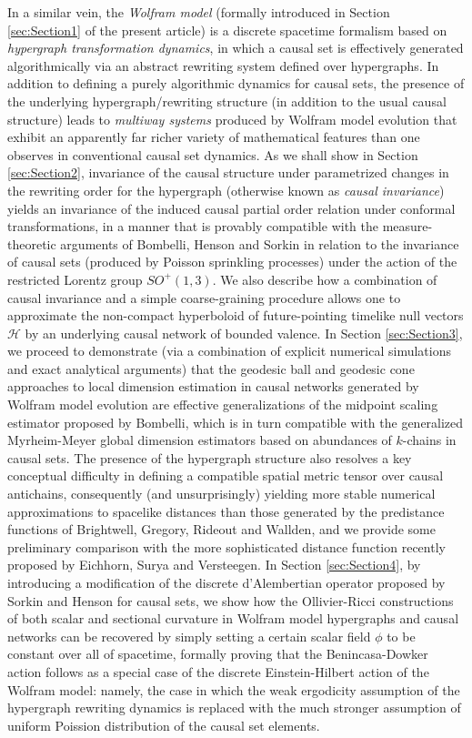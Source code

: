 \documentclass{article}
\begin{document}
In a similar vein, the \textit{Wolfram model}\cite{wolfram}\cite{wolfram2} (formally introduced in Section \ref{sec:Section1} of the present article) is a discrete spacetime formalism based on \textit{hypergraph transformation dynamics}\cite{gorard}\cite{gorard2}, in which a causal set is effectively generated algorithmically via an abstract rewriting system defined over hypergraphs. In addition to defining a purely algorithmic dynamics for causal sets, the presence of the underlying hypergraph/rewriting structure (in addition to the usual causal structure) leads to \textit{multiway systems} produced by Wolfram model evolution that exhibit an apparently far richer variety of mathematical features than one observes in conventional causal set dynamics. As we shall show in Section \ref{sec:Section2}, invariance of the causal structure under parametrized changes in the rewriting order for the hypergraph (otherwise known as \textit{causal invariance}) yields an invariance of the induced causal partial order relation under conformal transformations, in a manner that is provably compatible with the measure-theoretic arguments of Bombelli, Henson and Sorkin\cite{bombelli4} in relation to the invariance of causal sets (produced by Poisson sprinkling processes) under the action of the restricted Lorentz group ${SO^{+} \left( 1, 3 \right)}$. We also describe how a combination of causal invariance and a simple coarse-graining procedure allows one to approximate the non-compact hyperboloid of future-pointing timelike null vectors ${\mathcal{H}}$ by an underlying causal network of bounded valence. In Section \ref{sec:Section3}, we proceed to demonstrate (via a combination of explicit numerical simulations and exact analytical arguments) that the geodesic ball and geodesic cone approaches to local dimension estimation in causal networks generated by Wolfram model evolution are effective generalizations of the midpoint scaling estimator proposed by Bombelli, which is in turn compatible with the generalized Myrheim-Meyer global dimension estimators based on abundances of $k$-chains in causal sets. The presence of the hypergraph structure also resolves a key conceptual difficulty in defining a compatible spatial metric tensor over causal antichains, consequently (and unsurprisingly) yielding more stable numerical approximations to spacelike distances than those generated by the predistance functions of Brightwell, Gregory, Rideout and Wallden, and we provide some preliminary comparison with the more sophisticated distance function recently proposed by Eichhorn, Surya and Versteegen. In Section \ref{sec:Section4}, by introducing a modification of the discrete d'Alembertian operator proposed by Sorkin and Henson for causal sets, we show how the Ollivier-Ricci constructions of both scalar and sectional curvature in Wolfram model hypergraphs and causal networks can be recovered by simply setting a certain scalar field ${\phi}$ to be constant over all of spacetime, formally proving that the Benincasa-Dowker action follows as a special case of the discrete Einstein-Hilbert action of the Wolfram model: namely, the case in which the weak ergodicity assumption of the hypergraph rewriting dynamics is replaced with the much stronger assumption of uniform Poission distribution of the causal set elements. 
\end{document}
